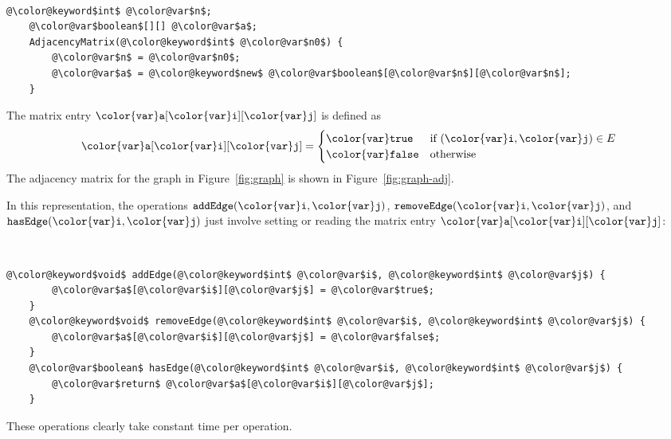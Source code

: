 \documentclass[10pt]{book}
\newcommand{\figref}[1]{Figure~\ref{fig:#1}}
\theoremstyle{plain}
\theoremstyle{definition}
\begin{document}
 \ \vspace{.5ex}\begin{Verbatim}[gobble=1,tabsize=2,frame=single,framerule=1.2pt,commandchars=\\@\$,label=\texttt{AdjacencyMatrix},labelposition=topline]
	@\color@keyword$int$ @\color@var$n$;
	@\color@var$boolean$[][] @\color@var$a$;
	AdjacencyMatrix(@\color@keyword$int$ @\color@var$n0$) {
		@\color@var$n$ = @\color@var$n0$;
		@\color@var$a$ = @\color@keyword$new$ @\color@var$boolean$[@\color@var$n$][@\color@var$n$];
	}
\end{Verbatim}


The matrix entry \ensuremath{\mathtt{{\color{var}a}[{\color{var}i}][{\color{var}j}]}} is defined as
\[  \ensuremath{\mathtt{{\color{var}a}[{\color{var}i}][{\color{var}j}]}}= 
    \begin{cases}
      \ensuremath{\mathtt{{\color{var}true}}} & \text{if $\ensuremath{\mathtt{({\color{var}i},{\color{var}j})}}\in E$} \\
      \ensuremath{\mathtt{{\color{var}false}}} & \text{otherwise}
    \end{cases}
\]
The adjacency matrix for the graph in \figref{graph} is
shown in \figref{graph-adj}.

In this representation, the operations \ensuremath{\mathtt{addEdge({\color{var}i},{\color{var}j})}},
\ensuremath{\mathtt{removeEdge({\color{var}i},{\color{var}j})}}, and \ensuremath{\mathtt{hasEdge({\color{var}i},{\color{var}j})}} just
involve setting or reading the matrix entry \ensuremath{\mathtt{{\color{var}a}[{\color{var}i}][{\color{var}j}]}}:


 \ \vspace{.5ex}\begin{Verbatim}[gobble=1,tabsize=2,frame=single,framerule=1.2pt,commandchars=\\@\$,label=\texttt{AdjacencyMatrix},labelposition=topline]
	@\color@keyword$void$ addEdge(@\color@keyword$int$ @\color@var$i$, @\color@keyword$int$ @\color@var$j$) {
		@\color@var$a$[@\color@var$i$][@\color@var$j$] = @\color@var$true$;
	}
	@\color@keyword$void$ removeEdge(@\color@keyword$int$ @\color@var$i$, @\color@keyword$int$ @\color@var$j$) {
		@\color@var$a$[@\color@var$i$][@\color@var$j$] = @\color@var$false$;
	}
	@\color@var$boolean$ hasEdge(@\color@keyword$int$ @\color@var$i$, @\color@keyword$int$ @\color@var$j$) {
		@\color@var$return$ @\color@var$a$[@\color@var$i$][@\color@var$j$];
	}
\end{Verbatim}

These operations clearly take constant time per operation.
\end{document}
